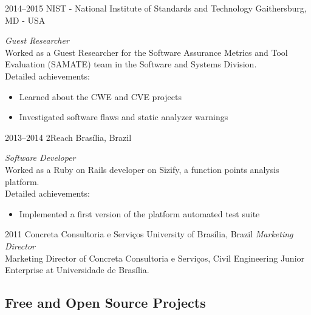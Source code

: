 \documentclass[print]{friggeri-cv}
\begin{document}
\begin{entrylist}
\entry
{2014--2015}
{NIST - National Institute of Standards and Technology}
{Gaithersburg, MD - USA}
{\emph{Guest Researcher} \\
  Worked as a Guest Researcher for the Software Assurance Metrics and Tool
  Evaluation (SAMATE) team in the Software and Systems Division. \\ Detailed
  achievements:
\begin{itemize}
\item Learned about the CWE and CVE projects
\item Investigated software flaws and static analyzer warnings
\end{itemize}
  }

\end{entrylist}
\begin{entrylist}


\entry
{2013--2014}
{2Reach}
{Brasília, Brazil}
{\emph{Software Developer} \\
  Worked as a Ruby on Rails developer on Sizify, a function points analysis
  platform. \\
Detailed achievements:
\begin{itemize}
  \item Implemented a first version of the platform automated test suite
\end{itemize}}


\entry
{2011}
{Concreta Consultoria e Serviços}
{University of Brasília, Brazil}
{\emph{Marketing Director} \\
Marketing Director of Concreta Consultoria e Serviços, Civil Engineering Junior
  Enterprise at Universidade de Brasília. \\
}


\end{entrylist}

\subsection{Free and Open Source Projects}
\end{document}
